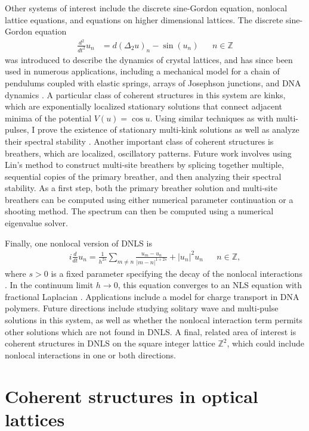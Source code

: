 \documentclass[12pt,reqno,oneside,hidelinks]{article}
\begin{document}
Other systems of interest include the discrete sine-Gordon equation, nonlocal lattice equations, and equations on higher dimensional lattices. The discrete sine-Gordon equation
\begin{align*}
    \frac{d^2}{dt^2}u_n &= d (\Delta_2 u)_n - \sin(u_n) && n \in \mathbb{Z}
\end{align*}
was introduced to describe the dynamics of crystal lattices, and has since been used in numerous applications, including a mechanical model for a chain of pendulums coupled with elastic springs, arrays of Josephson junctions, and DNA dynamics \cite{braun2004}. A particular class of coherent structures in this system are kinks, which are exponentially localized stationary solutions that connect adjacent minima of the potential $V(u) = \cos u$. Using similar techniques as with multi-pulses, I prove the existence of stationary multi-kink solutions as well as analyze their spectral stability \cite{parkerSG}. Another important class of coherent structures is breathers, which are localized, oscillatory patterns. Future work involves using Lin's method to construct multi-site breathers by splicing together multiple, sequential copies of the primary breather, and then analyzing their spectral stability. As a first step, both the primary breather solution and multi-site breathers can be computed using either numerical parameter continuation or a shooting method. The spectrum can then be computed using a numerical eigenvalue solver.

Finally, one nonlocal version of DNLS is
\begin{align*}
    i \frac{d}{dt} u_n = \frac{1}{h^{2s}} \sum_{m \neq n} \frac{u_m - u_n}{|m - n|^{1+2s}} + |u_n|^2 u_n && n \in \mathbb{Z},
\end{align*}
where $s > 0$ is a fixed parameter specifying the decay of the nonlocal interactions \cite{Kirkpatrick2013}. In the continuum limit $h\rightarrow 0$, this equation converges to an NLS equation with fractional Laplacian \cite{Kirkpatrick2013}. Applications include a model for charge transport in DNA polymers. Future directions include studying solitary wave and multi-pulse solutions in this system, as well as whether the nonlocal interaction term permits other solutions which are not found in DNLS. A final, related area of interest is coherent structures in DNLS on the square integer lattice $\mathbb{Z}^2$, which could include nonlocal interactions in one or both directions. 

\section*{Coherent structures in optical lattices}
\end{document}
